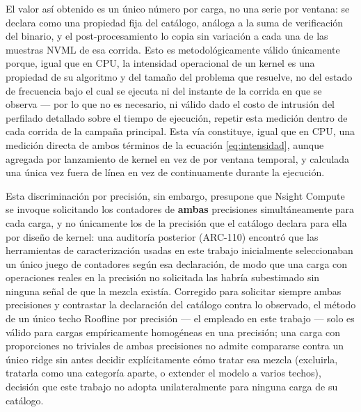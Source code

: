 \documentclass[12pt,oneside,spanish]{book}
\begin{document}
El valor así obtenido es un único número por carga, no una serie por ventana: se declara como una propiedad fija del catálogo, análoga a la suma de verificación del binario, y el post-procesamiento lo copia sin variación a cada una de las muestras NVML de esa corrida. Esto es metodológicamente válido únicamente porque, igual que en CPU, la intensidad operacional de un kernel es una propiedad de su algoritmo y del tamaño del problema que resuelve, no del estado de frecuencia bajo el cual se ejecuta ni del instante de la corrida en que se observa --- por lo que no es necesario, ni válido dado el costo de intrusión del perfilado detallado sobre el tiempo de ejecución, repetir esta medición dentro de cada corrida de la campaña principal. Esta vía constituye, igual que en CPU, una medición directa de ambos términos de la ecuación \eqref{eq:intensidad}, aunque agregada por lanzamiento de kernel en vez de por ventana temporal, y calculada una única vez fuera de línea en vez de continuamente durante la ejecución.

Esta discriminación por precisión, sin embargo, presupone que Nsight Compute se invoque solicitando los contadores de \textbf{ambas} precisiones simultáneamente para cada carga, y no únicamente los de la precisión que el catálogo declara para ella por diseño de kernel: una auditoría posterior (ARC-110) encontró que las herramientas de caracterización usadas en este trabajo inicialmente seleccionaban un único juego de contadores según esa declaración, de modo que una carga con operaciones reales en la precisión no solicitada las habría subestimado sin ninguna señal de que la mezcla existía. Corregido para solicitar siempre ambas precisiones y contrastar la declaración del catálogo contra lo observado, el método de un único techo Roofline por precisión --- el empleado en este trabajo --- solo es válido para cargas empíricamente homogéneas en una precisión; una carga con proporciones no triviales de ambas precisiones no admite compararse contra un único ridge sin antes decidir explícitamente cómo tratar esa mezcla (excluirla, tratarla como una categoría aparte, o extender el modelo a varios techos), decisión que este trabajo no adopta unilateralmente para ninguna carga de su catálogo.
\end{document}
